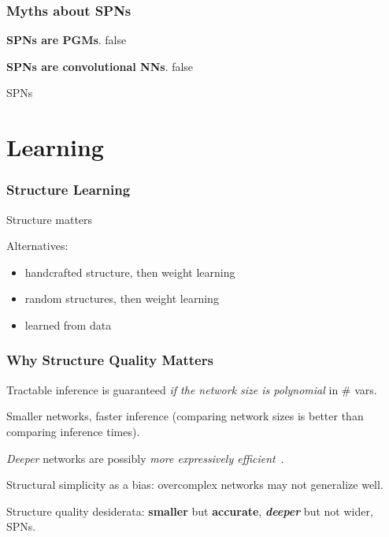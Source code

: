 \documentclass[xcolor={usenames,dvipsnames,svgnames}, compress]{beamer}
\begin{document}
\begin{frame}
  \frametitle{Myths about SPNs}
 \textbf{SPNs are PGMs}. false

 \textbf{SPNs are convolutional NNs}. false

  SPNs 
\end{frame}

\section{Learning}
{
  \begin{frame}
    \sectionpage
  \end{frame}
}

\begin{frame}
  \small
  \frametitle{Structure Learning}
  Structure matters

  Alternatives:
  \begin{itemize}
  \item handcrafted structure, then weight learning~\parencite{Poon2011}
  \item random structures, then weight learning~\parencite{Rashwan2016}
    \item learned from data
  \end{itemize}
\end{frame}

\begin{frame}
  \frametitle{Why Structure Quality Matters}

  \footnotesize
  
  Tractable inference is guaranteed \emph{if the network size is polynomial} in \#
  vars.\par\bigskip

  Smaller networks, faster inference (comparing network sizes is better than comparing inference times).\par\bigskip

  \emph{Deeper} networks are possibly \emph{more expressively efficient}~\emph{\parencite{Martens2014,Zhao2015}}.\par\bigskip

  Structural simplicity as a bias: overcomplex networks may not generalize well.\par\bigskip
  
  Structure quality desiderata: \textbf{\textbf{smaller}} but \textbf{\textbf{accurate}}, \textbf{\emph{deeper}} but not
  wider, SPNs.
\end{frame}
\end{document}
